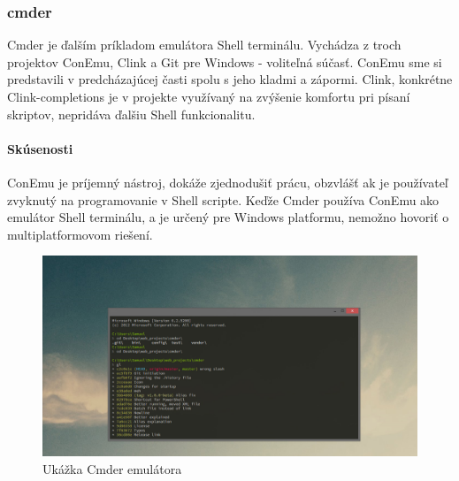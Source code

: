 \subsubsection{cmder}
\indent Cmder je ďalším príkladom emulátora Shell terminálu. Vychádza z troch projektov ConEmu, Clink a Git pre Windows - voliteľná súčasť. ConEmu sme si predstavili v predcházajúcej časti spolu s jeho kladmi a zápormi. Clink, konkrétne Clink-completions je v projekte využívaný na zvýšenie komfortu pri písaní skriptov, nepridáva ďalšiu Shell funkcionalitu. \cite{cmder}
\paragraph{Skúsenosti}
\indent ConEmu je príjemný nástroj, dokáže zjednodušiť prácu, obzvlášť ak je používateľ zvyknutý na programovanie v Shell scripte. Keďže Cmder používa ConEmu ako emulátor Shell terminálu, a je určený pre Windows platformu, nemožno hovoriť o multiplatformovom riešení.
\begin{figure}[H]
	\centering
	\includegraphics[scale=0.3]{img/cmder.jpg}
	\caption{Ukážka Cmder emulátora}
	\label{fig:test}
\end{figure}
\newpage
